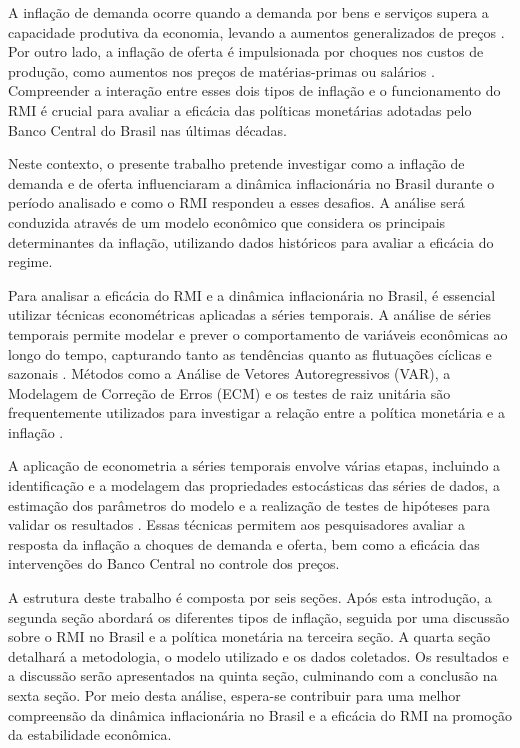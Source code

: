 \documentclass[12pt,oneside,a4paper,chapter=TITLE,english,brazil,sumario=abnt-6027-2012]{abntex2}
\begin{document}
A inflação de demanda ocorre quando a demanda por bens e serviços supera a capacidade produtiva da economia, levando a aumentos generalizados de preços \cite{olivierblanchard_2013_macroeconomics}. Por outro lado, a inflação de oferta é impulsionada por choques nos custos de produção, como aumentos nos preços de matérias-primas ou salários \cite{blinder_2008_the}. Compreender a interação entre esses dois tipos de inflação e o funcionamento do RMI é crucial para avaliar a eficácia das políticas monetárias adotadas pelo Banco Central do Brasil nas últimas décadas.

Neste contexto, o presente trabalho pretende investigar como a inflação de demanda e de oferta influenciaram a dinâmica inflacionária no Brasil durante o período analisado e como o RMI respondeu a esses desafios. A análise será conduzida através de um modelo econômico que considera os principais determinantes da inflação, utilizando dados históricos para avaliar a eficácia do regime.

Para analisar a eficácia do RMI e a dinâmica inflacionária no Brasil, é essencial utilizar técnicas econométricas aplicadas a séries temporais. A análise de séries temporais permite modelar e prever o comportamento de variáveis econômicas ao longo do tempo, capturando tanto as tendências quanto as flutuações cíclicas e sazonais \cite{enders_2015_applied}. Métodos como a Análise de Vetores Autoregressivos (VAR), a Modelagem de Correção de Erros (ECM) e os testes de raiz unitária são frequentemente utilizados para investigar a relação entre a política monetária e a inflação \cite{hamilton_2020_time}.

A aplicação de econometria a séries temporais envolve várias etapas, incluindo a identificação e a modelagem das propriedades estocásticas das séries de dados, a estimação dos parâmetros do modelo e a realização de testes de hipóteses para validar os resultados \cite{stock_2020_introduction}. Essas técnicas permitem aos pesquisadores avaliar a resposta da inflação a choques de demanda e oferta, bem como a eficácia das intervenções do Banco Central no controle dos preços.

A estrutura deste trabalho é composta por seis seções. Após esta introdução, a segunda seção abordará os diferentes tipos de inflação, seguida por uma discussão sobre o RMI no Brasil e a política monetária na terceira seção. A quarta seção detalhará a metodologia, o modelo utilizado e os dados coletados. Os resultados e a discussão serão apresentados na quinta seção, culminando com a conclusão na sexta seção. Por meio desta análise, espera-se contribuir para uma melhor compreensão da dinâmica inflacionária no Brasil e a eficácia do RMI na promoção da estabilidade econômica.
\end{document}

